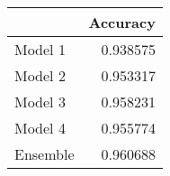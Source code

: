 \begin{tabular}{lr}
\toprule
{} &  Accuracy \\
\midrule
Model 1  &  0.938575 \\
Model 2  &  0.953317 \\
Model 3  &  0.958231 \\
Model 4  &  0.955774 \\
Ensemble &  0.960688 \\
\bottomrule
\end{tabular}
